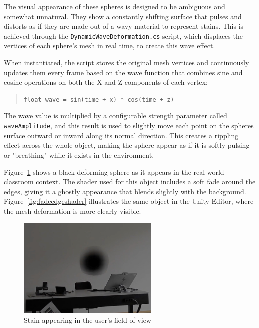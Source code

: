 \vspace{1em}

The visual appearance of these spheres is designed to be ambiguous and somewhat unnatural. They show a constantly shifting surface that pulses and distorts as if they are made out of a wavy material to represent stains. This is achieved through the \texttt{DynamicWaveDeformation.cs} script, which displaces the vertices of each sphere's mesh in real time, to create this wave effect.

\vspace{1em}

When instantiated, the script stores the original mesh vertices and continuously updates them every frame based on the wave function that combines sine and cosine operations on both the X and Z components of each vertex:

\begin{quote}
\texttt{float wave = sin(time + x) * cos(time + z)}
\end{quote}

The wave value is multiplied by a configurable strength parameter called \texttt{waveAmplitude}, and this result is used to slightly move each point on the spheres surface outward or inward along its normal direction. This creates a rippling effect across the whole object, making the sphere appear as if it is softly pulsing or "breathing" while it exists in the environment.

\vspace{1em}
Figure~\ref{fig:stain} shows a black deforming sphere as it appears in the real-world classroom context. The shader used for this object includes a soft fade around the edges, giving it a ghostly appearance that blends slightly with the background. Figure~\ref{fig:fadeedgeshader} illustrates the same object in the Unity Editor, where the mesh deformation is more clearly visible.

\begin{figure}[h!] 
    \centering 
    \includegraphics[width=0.6\textwidth]{../../Figures/stain-video.jpg} 
    \caption{Stain appearing in the user's field of view} 
    \label{fig:stain} 
\end{figure}


